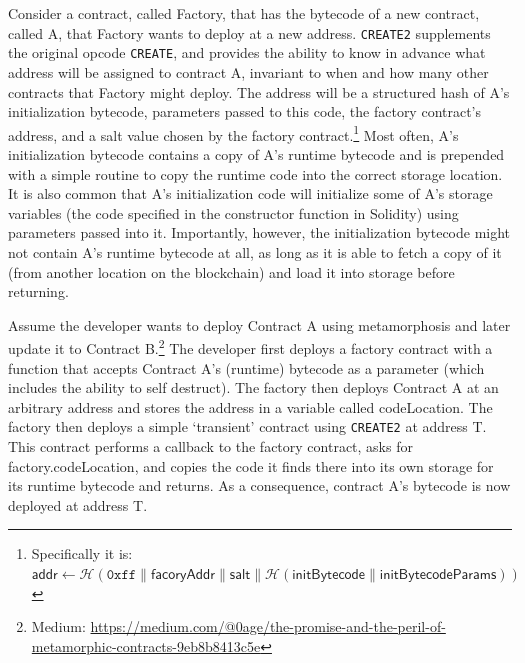 Consider a contract, called Factory, that has the bytecode of a new contract, called A, that Factory wants to deploy at a new address. \texttt{CREATE2} supplements the original opcode \texttt{CREATE}, and provides the ability to know in advance what address will be assigned to contract A, invariant to when and how many other contracts that Factory might deploy. The address will be a structured hash of A's initialization bytecode, parameters passed to this code, the factory contract's address, and a salt value chosen by the factory contract.\footnote{Specifically it is: $\mathsf{addr} \leftarrow \mathcal{H}(\mathtt{0xff} \| \mathsf{facoryAddr} \| \mathsf{salt} \| \mathcal{H} (\mathsf{initBytecode} \| \mathsf{initBytecodeParams}))$} Most often, A's initialization bytecode contains a copy of A's runtime bytecode and is prepended with a simple routine to copy the runtime code into the correct storage location. It is also common that A's initialization code will initialize some of A's storage variables (\eg the code specified in the constructor function in Solidity) using parameters passed into it. Importantly, however, the initialization bytecode might not contain A's runtime bytecode at all, as long as it is able to fetch a copy of it (\eg from another location on the blockchain) and load it into storage before returning.


Assume the developer wants to deploy Contract A using metamorphosis and later update it to Contract B.\footnote{Medium: \url{https://medium.com/@0age/the-promise-and-the-peril-of-metamorphic-contracts-9eb8b8413c5e}} The developer first deploys a factory contract with a function that accepts Contract A's (runtime) bytecode as a parameter (which includes the ability to self destruct). The factory then deploys Contract A at an arbitrary address and stores the address in a variable called codeLocation. The factory then deploys a simple `transient' contract using \texttt{CREATE2} at address T. This contract performs a callback to the factory contract, asks for factory.codeLocation, and copies the code it finds there into its own storage for its runtime bytecode and returns. As a consequence, contract A's bytecode is now deployed at address T. 

